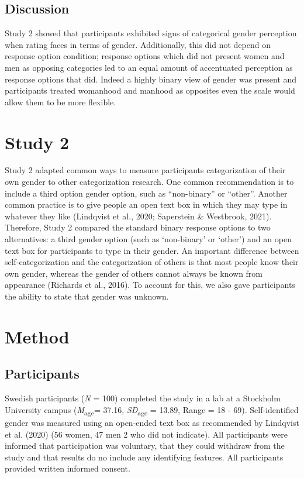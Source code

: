 \documentclass[
  man]{apa7}
\begin{document}
\hypertarget{discussion}{%
\subsection{Discussion}\label{discussion}}

Study 2 showed that participants exhibited signs of categorical gender perception when rating faces in terms of gender. Additionally, this did not depend on response option condition; response options which did not present women and men as opposing categories led to an equal amount of accentuated perception as response options that did. Indeed a highly binary view of gender was present and participants treated womanhood and manhood as opposites even the scale would allow them to be more flexible.

\hypertarget{study-2}{%
\section{Study 2}\label{study-2}}

Study 2 adapted common ways to measure participants categorization of their own gender to other categorization research. One common recommendation is to include a third option gender option, such as ``non-binary'' or ``other''. Another common practice is to give people an open text box in which they may type in whatever they like (Lindqvist et al., 2020; Saperstein \& Westbrook, 2021). Therefore, Study 2 compared the standard binary response options to two alternatives: a third gender option (such as `non-binary' or `other') and an open text box for participants to type in their gender. An important difference between self-categorization and the categorization of others is that most people know their own gender, whereas the gender of others cannot always be known from appearance (Richards et al., 2016). To account for this, we also gave participants the ability to state that gender was unknown.

\hypertarget{method-1}{%
\section{Method}\label{method-1}}

\hypertarget{participants-1}{%
\subsection{Participants}\label{participants-1}}

Swedish participants (\emph{N} = 100) completed the study in a lab at a Stockholm University campus (\emph{M}\textsubscript{age}= 37.16, \emph{SD}\textsubscript{age} = 13.89, Range = 18 - 69). Self-identified gender was measured using an open-ended text box as recommended by Lindqvist et al. (2020) (56 women, 47 men 2 who did not indicate). All participants were informed that participation was voluntary, that they could withdraw from the study and that results do no include any identifying features. All participants provided written informed consent.
\end{document}
